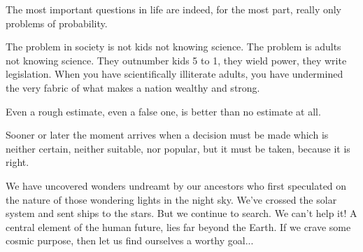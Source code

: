  	\begin{fquote}The most important questions in life are indeed, for the most part, really only problems of probability.
 	\end{fquote}
 	
 	\begin{fquote}The problem in society is not kids not knowing science. The problem is adults not knowing science. They outnumber kids 5 to 1, they wield power, they write legislation. When you have scientifically illiterate adults, you have undermined the very fabric of what makes a nation wealthy and strong.
 	\end{fquote}
 	
 	\begin{fquote}Even a rough estimate, even a false one, is better than no estimate at all.
 	\end{fquote}
 	
 	\begin{fquote}Sooner or later the moment arrives when a decision must be made which is neither certain, neither suitable, nor popular, but it must be taken, because it is right.
 	\end{fquote}
 	
 	\begin{fquote}We have uncovered wonders undreamt by our ancestors who first speculated on the nature of those wondering lights in the night sky. We've crossed the solar system and sent ships to the stars. But we continue to search. We can't help it! A central element of the human future, lies far beyond the Earth. If we crave some cosmic purpose, then let us find ourselves a worthy goal...
 	\end{fquote}